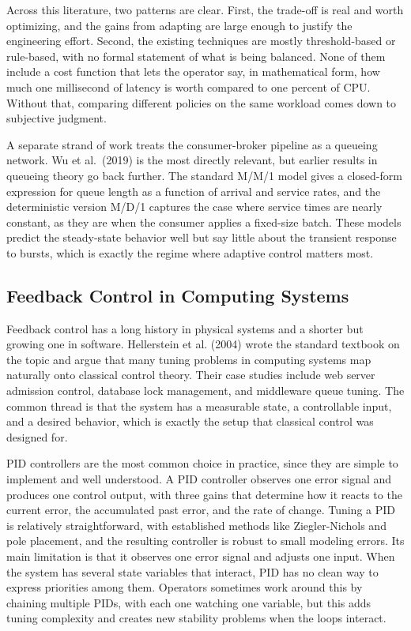 \documentclass[10pt,a4paper]{article}
\begin{document}
Across this literature, two patterns are clear. First, the trade-off is real and worth optimizing, and the gains from adapting are large enough to justify the engineering effort. Second, the existing techniques are mostly threshold-based or rule-based, with no formal statement of what is being balanced. None of them include a cost function that lets the operator say, in mathematical form, how much one millisecond of latency is worth compared to one percent of CPU. Without that, comparing different policies on the same workload comes down to subjective judgment.

A separate strand of work treats the consumer-broker pipeline as a queueing network. Wu et al.\ (2019) is the most directly relevant, but earlier results in queueing theory go back further. The standard M/M/1 model gives a closed-form expression for queue length as a function of arrival and service rates, and the deterministic version M/D/1 captures the case where service times are nearly constant, as they are when the consumer applies a fixed-size batch. These models predict the steady-state behavior well but say little about the transient response to bursts, which is exactly the regime where adaptive control matters most.

\subsection{Feedback Control in Computing Systems}

Feedback control has a long history in physical systems and a shorter but growing one in software. Hellerstein et al. (2004) wrote the standard textbook on the topic and argue that many tuning problems in computing systems map naturally onto classical control theory. Their case studies include web server admission control, database lock management, and middleware queue tuning. The common thread is that the system has a measurable state, a controllable input, and a desired behavior, which is exactly the setup that classical control was designed for.

PID controllers are the most common choice in practice, since they are simple to implement and well understood. A PID controller observes one error signal and produces one control output, with three gains that determine how it reacts to the current error, the accumulated past error, and the rate of change. Tuning a PID is relatively straightforward, with established methods like Ziegler-Nichols and pole placement, and the resulting controller is robust to small modeling errors. Its main limitation is that it observes one error signal and adjusts one input. When the system has several state variables that interact, PID has no clean way to express priorities among them. Operators sometimes work around this by chaining multiple PIDs, with each one watching one variable, but this adds tuning complexity and creates new stability problems when the loops interact.
\end{document}
